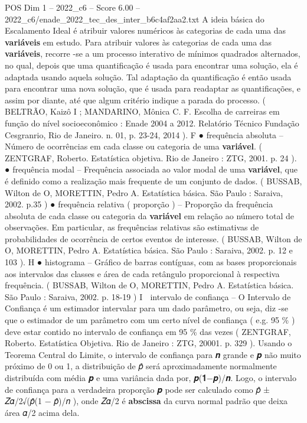 \begin{textsample}{POS Dim 1 – 2022\_c6 – Score 6.00 – 2022\_c6/enade\_2022\_tec\_des\_inter\_b6c4af2aa2.txt}
A ideia básica do Escalamento Ideal é atribuir valores numéricos às categorias de cada uma das \textbf{variáveis} em estudo.
Para atribuir valores às categorias de cada uma das \textbf{variáveis}, recorre -se a um processo interativo de mínimos quadrados alternados, no qual, depois que uma quantificação é usada para encontrar uma solução, ela é adaptada usando aquela solução.
Tal adaptação da quantificação é então usada para encontrar uma nova solução, que é usada para readaptar as quantificações, e assim por diante, até que algum critério indique a parada do processo. ( BELTRÃO, Kaizô I ; MANDARINO, Mônica C.
F.
Escolha de carreiras em função do nível socioeconômico : Enade 2004 a 2012.
Relatório Técnico Fundação Cesgranrio, Rio de Janeiro. n. 01, p. 23-24, 2014 ).
F {\EmojiFont ●} frequência absoluta – Número de ocorrências em cada classe ou categoria de uma \textbf{variável}. ( ZENTGRAF, Roberto.
Estatística objetiva.
Rio de Janeiro : ZTG, 2001. p. 24 ). {\EmojiFont ●} frequência modal – Frequência associada ao valor modal de uma \textbf{variável}, que é definido como a realização mais frequente de um conjunto de dados. ( BUSSAB, Wilton de O, MORETTIN, Pedro A.
Estatística básica.
São Paulo : Saraiva, 2002. p.35 ) {\EmojiFont ●} frequência relativa ( proporção ) – Proporção da frequência absoluta de cada classe ou categoria da \textbf{variável} em relação ao número total de observações.
Em particular, as frequências relativas são estimativas de probabilidades de ocorrência de certos eventos de interesse. ( BUSSAB, Wilton de O, MORETTIN, Pedro A.
Estatística básica.
São Paulo : Saraiva, 2002. p. 12 e 103 ).
H {\EmojiFont ●} histograma – Gráfico de barras contíguas, com as bases proporcionais aos intervalos das classes e área de cada retângulo proporcional à respectiva frequência. ( BUSSAB, Wilton de O, MORETTIN, Pedro A.
Estatística básica.
São Paulo : Saraiva, 2002. p. 18-19 ) I  intervalo de confiança – O Intervalo de Confiança é um estimador intervalar para um dado parâmetro, ou seja, diz -se que o estimador de um parâmetro com um certo nível de confiança ( e.g. 95 \% ) deve estar contido no intervalo de confiança em 95 \% das vezes ( ZENTGRAF, Roberto.
Estatística Objetiva.
Rio de Janeiro : ZTG, 20001. p. 329 ).
Usando o Teorema Central do Limite, o intervalo de confiança para 𝒏 grande e 𝒑 não muito próximo de 0 ou 1, a distribuição de 𝑝̂ será aproximadamente normalmente distribuída com média 𝒑 e uma variância dada por, 𝒑(𝟏−𝒑)/𝒏.
Logo, o intervalo de confiança para a verdadeira proporção 𝒑 pode ser calculado como 𝑝̂ ± 𝑍𝛼/2√(𝑝̂(1 − 𝑝̂)/𝑛 ), onde 𝑍𝛼/2 é \textbf{abscissa} da curva normal padrão que deixa área 𝛼/2 acima dela.

\end{textsample}
